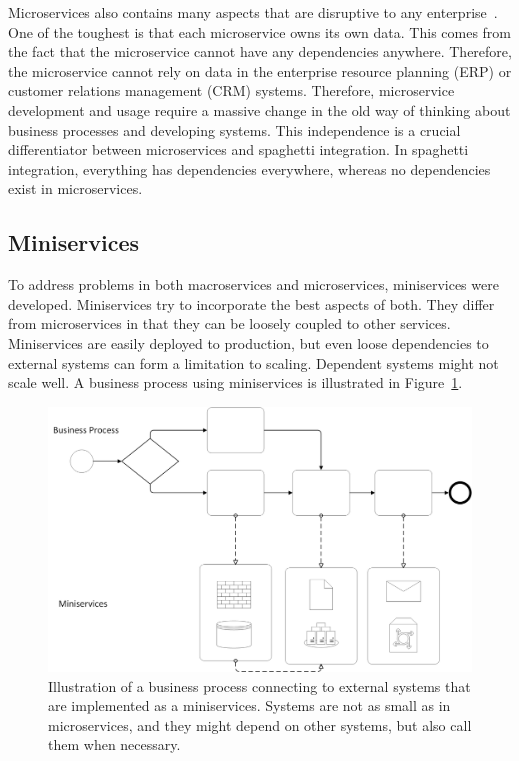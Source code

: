 \documentclass[english, 12pt, a4paper, sci, utf8, a-2b, online, obeyspaces]{aaltothesis}
\begin{document}
Microservices also contains many aspects that are disruptive to any enterprise~\cite{balalaie2016microservices}. One of the toughest is that each microservice owns its own data. This comes from the fact that the microservice cannot have any dependencies anywhere. Therefore, the microservice cannot rely on data in the enterprise resource planning (ERP) or customer relations management (CRM) systems. Therefore, microservice development and usage require a massive change in the old way of thinking about business processes and developing systems. This independence is a crucial differentiator between microservices and spaghetti integration. In spaghetti integration, everything has dependencies everywhere, whereas no dependencies exist in microservices. 

\subsection{Miniservices}
\label{sec:miniservices}
To address problems in both macroservices and microservices, miniservices were developed. Miniservices try to incorporate the best aspects of both. They differ from microservices in that they can be loosely coupled to other services. Miniservices are easily deployed to production, but even loose dependencies to external systems can form a limitation to scaling. Dependent systems might not scale well. A business process using miniservices is illustrated in Figure~\ref{fig:miniservices}.

\begin{figure}[htbp]
  \centering
      \includegraphics[width=\textwidth]{pictures/Architecture/Miniservices.png}
  \caption{Illustration of a business process connecting to external systems that are implemented as a miniservices. Systems are not as small as in microservices, and they might depend on other systems, but also call them when necessary.}
  \label{fig:miniservices}
\end{figure}
\end{document}
